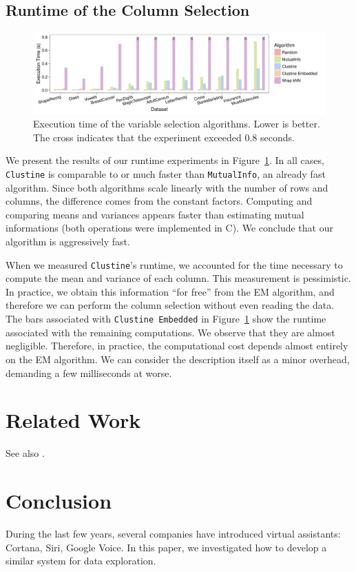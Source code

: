 \subsection{Runtime of the Column Selection}
\label{sec:speed}

\begin{figure}[t]
  \centering
  \includegraphics[width=\textwidth]{Experiments/Timings}
  \caption{Execution time of the variable selection algorithms. Lower is
  better. The cross indicates that the experiment exceeded 0.8 seconds.}
  \label{pic:runtime}
\end{figure}

We present the results of our runtime experiments in Figure~\ref{pic:runtime}.
In all cases, \texttt{Clustine} is comparable to or much faster than
\texttt{MutualInfo}, an already fast algorithm. Since both algorithms scale
linearly with the number of rows and columns, the difference comes from the
constant factors. Computing and comparing means and variances appears faster
than estimating mutual informations (both operations were implemented in C).
We conclude that our algorithm is aggressively fast.

When we measured \texttt{Clustine}'s runtime, we accounted for the time
necessary to compute the mean and variance of each column. This measurement is
pessimistic. In practice, we obtain this information ``for free'' from the EM
algorithm, and therefore we can perform the column selection without even
reading the data. The bars associated with \texttt{Clustine Embedded} in
Figure~\ref{pic:runtime} show the runtime associated with the remaining
computations. We observe that they are almost negligible. Therefore, in
practice, the computational cost depends almost entirely on the EM algorithm.
We can consider the description itself as a minor overhead, demanding a few
milliseconds at worse.


\section{Related Work}
\label{sec:related}
See also \cite{li2014constructing}.

\section{Conclusion}
\label{sec:conclusion}
During the last few years, several companies have introduced virtual
assistants: Cortana, Siri, Google Voice. In this paper, we investigated how to
develop a similar system for data exploration.
